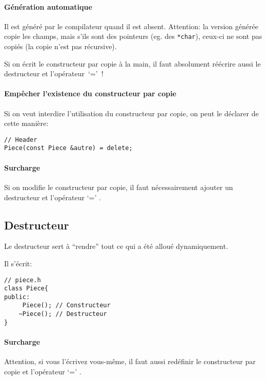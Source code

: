 \documentclass[10pt,a4paper,french]{article}
\begin{document}
\paragraph{Génération automatique}

Il est généré par le compilateur quand il est absent. Attention: la version générée copie les champs, mais s'ils sont des pointeurs (eg. des \texttt{*char}), ceux-ci ne sont pas copiés (la copie n'est pas récursive).

Si on écrit le constructeur par copie à la main, il faut absolument réécrire aussi le destructeur et l'opérateur~`='~!

\paragraph{Empêcher l'existence du constructeur par copie}

Si on veut interdire l'utilisation du constructeur par copie, on peut le déclarer de cette manière:

\begin{verbatim}
// Header
Piece(const Piece &autre) = delete;
\end{verbatim}

\paragraph{Surcharge}
Si on modifie le constructeur par copie, il faut nécessairement ajouter un destructeur  et l'opérateur `=' .

\subsection{Destructeur\label{destructeur}}

Le destructeur sert à ``rendre'' tout ce qui a été alloué dynamiquement.

Il s'écrit:
\begin{verbatim}
// piece.h
class Piece{
public:
     Piece(); // Constructeur
    ~Piece(); // Destructeur
}
\end{verbatim}

\paragraph{Surcharge}
Attention, si vous l'écrivez vous-même, il faut aussi redéfinir le constructeur par copie  et l'opérateur `=' .
\end{document}
